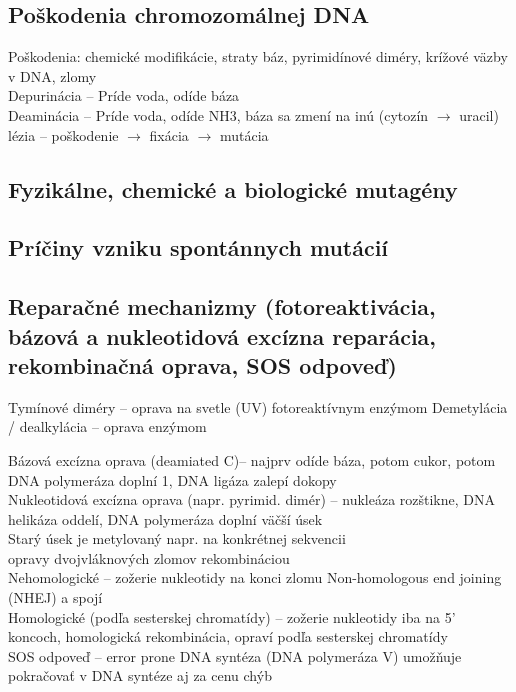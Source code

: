 \subsection{Poškodenia chromozomálnej DNA}
Poškodenia: chemické modifikácie, straty báz, pyrimidínové diméry, krížové väzby v DNA, zlomy\\
Depurinácia -- Príde voda, odíde báza\\
Deaminácia -- Príde voda, odíde NH3, báza sa zmení na inú (cytozín $\rightarrow$ uracil)\\
lézia -- poškodenie $\rightarrow$ fixácia $\rightarrow$ mutácia\\
\subsection{Fyzikálne, chemické a biologické mutagény}

\subsection{Príčiny vzniku spontánnych mutácií}

\subsection{Reparačné mechanizmy (fotoreaktivácia, bázová a nukleotidová excízna reparácia, rekombinačná oprava, SOS odpoveď)}

Tymínové diméry -- oprava na svetle (UV) fotoreaktívnym enzýmom
Demetylácia / dealkylácia -- oprava enzýmom

Bázová excízna oprava (deamiated C)-- najprv odíde báza, potom cukor, potom DNA polymeráza doplní 1, DNA ligáza zalepí dokopy\\
Nukleotidová excízna oprava (napr. pyrimid. dimér) -- nukleáza rozštikne, DNA helikáza oddelí, DNA polymeráza doplní väčší úsek\\
Starý úsek je metylovaný napr. na konkrétnej sekvencii\\

opravy dvojvláknových zlomov rekombináciou\\
\tab Nehomologické -- zožerie nukleotidy na konci zlomu Non-homologous end joining (NHEJ) a spojí\\
\tab Homologické (podľa sesterskej chromatídy) -- zožerie nukleotidy iba na 5' koncoch, homologická rekombinácia, opraví podľa sesterskej chromatídy\\

SOS odpoveď -- error prone DNA syntéza (DNA polymeráza V) umožňuje pokračovať v DNA syntéze aj za cenu chýb\\
